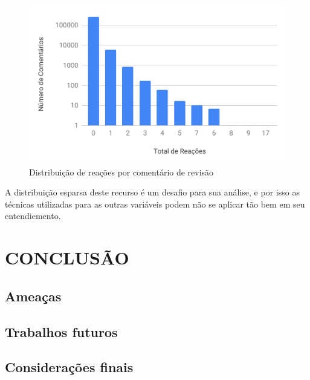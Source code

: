 \documentclass[12pt,openany,oneside,a4paper,english,brazil]{abntbibufjf}
\begin{document}
\begin{figure}[!htbp]
 \includegraphics[width=\textwidth]{dist-rc-reaction}
 \caption{Distribuição de reações por comentário de revisão}\label{fig:dist-rc-reaction}
\end{figure}

A distribuição esparsa deste recurso é um desafio para sua análise, e por isso as técnicas utilizadas para as outras variáveis podem não se aplicar tão bem em seu entendiemento.

\chapter{CONCLUSÃO}\label{chap:conclusao}

  \section{Ameaças}\label{sec:ameacas}

  \section{Trabalhos futuros}\label{sec:trabalhos_futuros}

  \section{Considerações finais}\label{sec:consideracoes_finais}






\postextual








\end{document}
